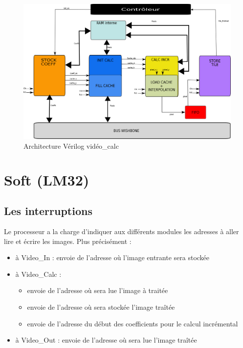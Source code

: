 \documentclass[a4paper,12pt]{report}
\begin{document}
{{                               \begin{figure}[!h]
	                         \centering
	                         \includegraphics[scale = 0.15]{video_calc_verilog.png}
	                         \caption{Architecture Vérilog vidéo\_calc}
                               \end{figure}

                               \chapter{Soft (LM32)}

		               \section{Les interruptions}

                                               {Le processeur a la charge d'indiquer aux différents modules les adresses à aller lire et écrire les images. Plus précisément :

                                                 \begin{itemize}
	                                         \item à Video\_In : envoie de l'adresse où l'image entrante sera stockée
	                                         \item à Video\_Calc : \begin{itemize}
						 \item envoie de l'adresse où sera lue l'image à traitée
						 \item envoie de l'adresse où sera stockée l'image traîtée
						 \item envoie de l'adresse du début des coefficients pour le calcul incrémental
						 \end{itemize}
	                                         \item à Video\_Out : envoie de l'adresse où sera lue l'image traîtée
                                                 \end{itemize}

}}}
\end{document}
